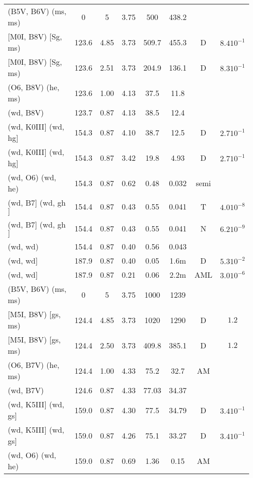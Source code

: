 \documentclass{article}
\begin{document}
\begin{table}
\begin{tabular}{p{4cm}ccccccc}
\hline
(B5V, B6V) (ms, ms)	& 0	& 5	& 3.75	& 500	& 438.2	&       &			\\
$[$M0I, B8V) $[$Sg, ms)	& 123.6	& 4.85	& 3.73	& 509.7	& 455.3	& D     & $8.4 10^{-1}$		\\
$[$M0I, B8V) $[$Sg, ms)	& 123.6	& 2.51	& 3.73	& 204.9	& 136.1	& D     & $8.3 10^{-1}$		\\
(O6, B8V) (he, ms)	& 123.6	&1.00 	& 4.13	& 37.5 	& 11.8 	&       &               	\\
(wd, B8V)         	& 123.7	& 0.87	& 4.13	& 38.5 	& 12.4 	&       &               	\\
(wd, K0III$]$ (wd, hg$]$	& 154.3	& 0.87	& 4.10	& 38.7 	& 12.5 	& D     & $2.7 10^{-1}$		\\
(wd, K0III$]$ (wd, hg$]$	& 154.3	& 0.87	& 3.42	& 19.8 	& 4.93 	& D     & $2.7 10^{-1}$		\\
(wd, O6) (wd, he)	& 154.3	& 0.87	& 0.62	& 0.48 	& 0.032	& semi  &              		\\
(wd, B7$]$ (wd, gh$]$	& 154.4	& 0.87	& 0.43	& 0.55 	& 0.041	& T     & $4.0 10^{-8}$		\\
(wd, B7$]$ (wd, gh$]$	& 154.4	& 0.87	& 0.43	& 0.55 	& 0.041	& N     & $6.2 10^{-9}$		\\
(wd, wd)         	& 154.4	& 0.87	& 0.40	& 0.56 	& 0.043	&       &               	\\
(wd, wd$]$         	& 187.9	& 0.87	& 0.40	& 0.05 	& 1.6m 	& D     & $5.3 10^{-2}$		\\
(wd, wd$]$         	& 187.9	& 0.87	& 0.21	& 0.06 	& 2.2m 	& AML   & $3.0 10^{-6}$		\\
\hline
(B5V, B6V) (ms, ms)	& 0	& 5	& 3.75	& 1000	& 1239	&       &			\\
$[$M5I, B8V) $[$gs, ms)	& 124.4	& 4.85	& 3.73	& 1020 	& 1290 	& D     & $1.2$			\\
$[$M5I, B8V) $[$gs, ms)	& 124.4	& 2.50	& 3.73	& 409.8	& 385.1	& D     & $1.2$			\\
(O6, B7V) (he, ms)	& 124.4	& 1.00	& 4.33	& 75.2 	& 32.7 	& AM    &               	\\
(wd, B7V)         	& 124.6	& 0.87	& 4.33	& 77.03	& 34.37	&       &               	\\
(wd, K5III$]$ (wd, gs$]$	& 159.0	& 0.87	& 4.30	& 77.5 	& 34.79	& D     & $3.4 10^{-1}$		\\
(wd, K5III$]$ (wd, gs$]$	& 159.0	& 0.87	& 4.26	& 75.1 	& 33.27	& D     & $3.4 10^{-1}$		\\
(wd, O6) (wd, he)	& 159.0	& 0.87	& 0.69	& 1.36 	& 0.15 	& AM    &              		\\

\end{tabular}
\end{table}
\end{document}
